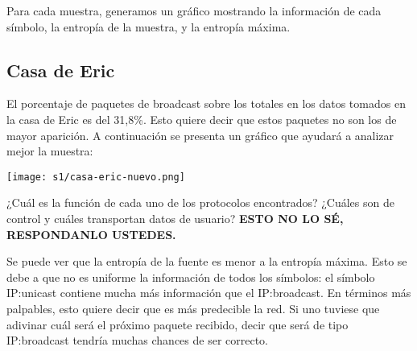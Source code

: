 

Para cada muestra, generamos un gráfico mostrando la información de cada símbolo,
la entropía de la muestra, y la entropía máxima.

\subsection{Casa de Eric}
El porcentaje de paquetes de broadcast sobre los totales en los datos tomados en la 
casa de Eric es del 31,8\%. Esto quiere decir que estos paquetes no son los de 
mayor aparición. A continuación se presenta un gráfico que ayudará a analizar mejor
la muestra:

\texttt{[image: s1/casa-eric-nuevo.png]}


¿Cuál es la función de cada uno de los protocolos encontrados? 
¿Cuáles son de control y cuáles transportan datos de usuario? 
\textbf{ESTO NO LO SÉ, RESPONDANLO USTEDES.}


Se puede ver que la entropía de la fuente es menor a la entropía máxima. Esto
se debe a que no es uniforme la información de todos los símbolos: el símbolo
IP:unicast contiene mucha más información que el IP:broadcast. En términos más
palpables, esto quiere decir que es más predecible la red. Si uno tuviese que
adivinar cuál será el próximo paquete recibido, decir que será de tipo
IP:broadcast tendría muchas chances de ser correcto.



